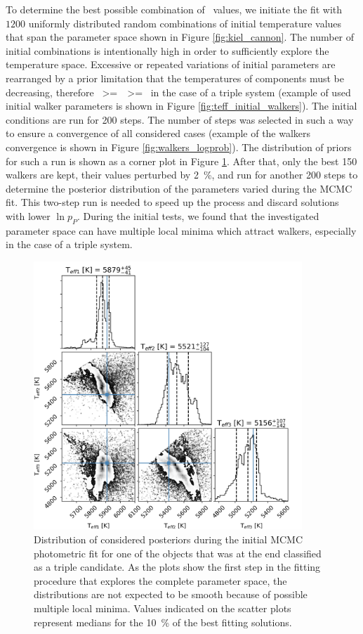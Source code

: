 To determine the best possible combination of \Teff\ values, we initiate the fit with $1200$ uniformly distributed random combinations of initial temperature values that span the parameter space shown in Figure \ref{fig:kiel_cannon}. The number of initial combinations is intentionally high in order to sufficiently explore the temperature space. Excessive or repeated variations of initial parameters are rearranged by a prior limitation that the temperatures of components must be decreasing, therefore ~>=~~>=~ in the case of a triple system (example of used initial walker parameters is shown in Figure \ref{fig:teff_initial_walkers}). The initial conditions are run for 200 steps. The number of steps was selected in such a way to ensure a convergence of all considered cases (example of the walkers convergence is shown in Figure \ref{fig:walkers_logprob}). The distribution of priors for such a run is shown as a corner plot in Figure \ref{fig:posterior_dist}. After that, only the best 150 walkers are kept, their values perturbed by 2~\%, and run for another 200 steps to determine the posterior distribution of the parameters varied during the MCMC fit. This two-step run is needed to speed up the process and discard solutions with lower $\ln p_{P}$. During the initial tests, we found that the investigated parameter space can have multiple local minima which attract walkers, especially in the case of a triple system.

\begin{figure}
	\centering
	\includegraphics[width=0.9\textwidth]{150408004101169_p1884_corner_3star_00.png}
	\caption{Distribution of considered posteriors during the initial MCMC photometric fit for one of the objects that was at the end classified as a triple candidate. As the plots show the first step in the fitting procedure that explores the complete parameter space, the distributions are not expected to be smooth because of possible multiple local minima. Values indicated on the scatter plots represent medians for the 10~\% of the best fitting solutions.}
	\label{fig:posterior_dist}
\end{figure}

